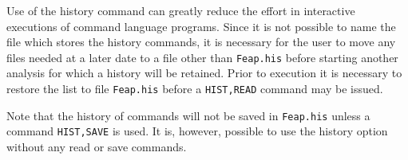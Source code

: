 Use of the history command can greatly reduce the effort in
interactive executions of command language programs.  Since it is not
possible to name the file which stores the history
commands, it is necessary for the user to move any
files needed at a later date to a file other than
{\tt Feap.his} before starting another analysis for which a
history will be retained.  Prior to execution it is necessary
to restore the list to file {\tt Feap.his} before a
{\tt HIST,READ} command may be issued.

Note that the history of commands will not be
saved in {\tt Feap.his} unless a command {\tt HIST,SAVE} is
used.  It is, however, possible to use the history option
without any read or save commands.
\vfill\eject
